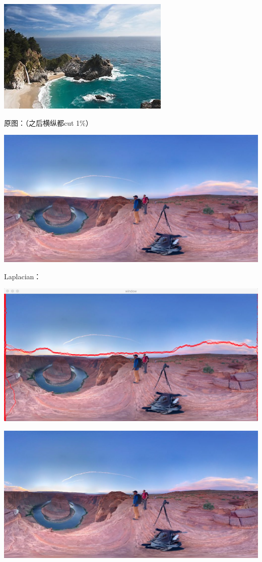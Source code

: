 \documentclass[10pt, a4paper]{article}
\begin{document}
    \includegraphics[scale = .3]{4sobel.jpg}

    原图：（之后横纵都cut 1$\%$）

    \includegraphics[scale = .3]{5.jpg}

    Laplacian：

    \includegraphics[scale = .3]{5lapseam.png}

    \includegraphics[scale = .3]{5lap.jpg}
\end{document}
